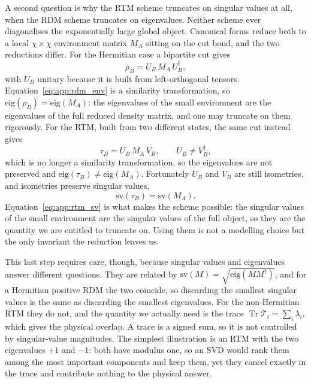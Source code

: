 A second question is why the \ac{RTM} scheme truncates on singular values at all, when the \ac{RDM} scheme truncates on eigenvalues. Neither scheme ever diagonalises the exponentially large global object. Canonical forms reduce both to a local $\chi\times\chi$ environment matrix $M_A$ sitting on the cut bond, and the two reductions differ. For the Hermitian case a bipartite cut gives
\begin{equation}
  \rho_B = U_B\,M_A\,U_B^{\dagger},
  \label{eq:app:rdm_env}
\end{equation}
with $U_B$ unitary because it is built from left-orthogonal tensors. Equation~\eqref{eq:app:rdm_env} is a similarity transformation, so $\mathrm{eig}(\rho_B)=\mathrm{eig}(M_A)$: the eigenvalues of the small environment are the eigenvalues of the full reduced density matrix, and one may truncate on them rigorously. For the \ac{RTM}, built from two different states, the same cut instead gives
\begin{equation}
  \tau_B = U_B\,M_A\,V_B,
  \qquad U_B \neq V_B^{\dagger},
  \label{eq:app:rtm_env}
\end{equation}
which is no longer a similarity transformation, so the eigenvalues are not preserved and $\mathrm{eig}(\tau_B)\neq\mathrm{eig}(M_A)$. Fortunately $U_B$ and $V_B$ are still isometries, and isometries preserve singular values,
\begin{equation}
  \mathrm{sv}(\tau_B) = \mathrm{sv}(M_A).
  \label{eq:app:rtm_sv}
\end{equation}
Equation~\eqref{eq:app:rtm_sv} is what makes the scheme possible: the singular values of the small environment are the singular values of the full object, so they are the quantity we are entitled to truncate on. Using them is not a modelling choice but the only invariant the reduction leaves us.

This last step requires care, though, because singular values and eigenvalues answer different questions. They are related by $\mathrm{sv}(M)=\sqrt{\mathrm{eig}(MM^{\dagger})}$, and for a Hermitian positive \ac{RDM} the two coincide, so discarding the smallest singular values is the same as discarding the smallest eigenvalues. For the non-Hermitian \ac{RTM} they do not, and the quantity we actually need is the trace $\operatorname{Tr}\mathcal{T}_t=\sum_i\lambda_i$, which gives the physical overlap. A trace is a signed sum, so it is not controlled by singular-value magnitudes. The simplest illustration is an \ac{RTM} with the two eigenvalues $+1$ and $-1$: both have modulus one, so an \ac{SVD} would rank them among the most important components and keep them, yet they cancel exactly in the trace and contribute nothing to the physical answer.


